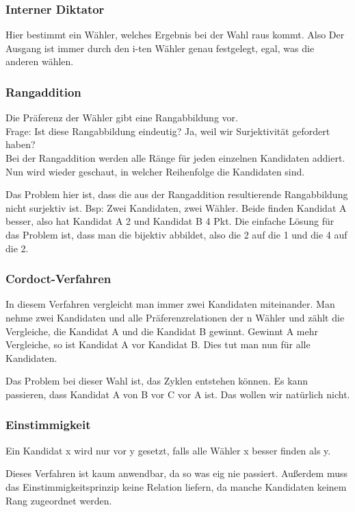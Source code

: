 \documentclass[]{article}
\begin{document}
\subsubsection*{Interner Diktator}
Hier bestimmt ein Wähler, welches Ergebnis bei der Wahl raus kommt. Also Der Ausgang ist immer durch den i-ten Wähler genau festgelegt, egal, was die anderen wählen.

\subsubsection*{Rangaddition}
Die Präferenz der Wähler gibt eine Rangabbildung vor. \\

Frage: Ist diese Rangabbildung eindeutig? Ja, weil wir Surjektivität gefordert haben? \\

Bei der Rangaddition werden alle Ränge für jeden einzelnen Kandidaten addiert. Nun wird wieder geschaut, in welcher Reihenfolge die Kandidaten sind. 

Das Problem hier ist, dass die aus der Rangaddition resultierende Rangabbildung nicht surjektiv ist. Bsp: Zwei Kandidaten, zwei Wähler. Beide finden Kandidat A besser, also hat Kandidat A 2 und Kandidat B 4 Pkt. Die einfache Lösung für das Problem ist, dass man die bijektiv abbildet, also die 2 auf die 1 und die 4 auf die 2. 

\subsubsection*{Cordoct-Verfahren}
 In diesem Verfahren vergleicht man immer zwei Kandidaten miteinander. Man nehme zwei Kandidaten und alle Präferenzrelationen der n Wähler und zählt die Vergleiche, die Kandidat A und die Kandidat B gewinnt. Gewinnt A mehr Vergleiche, so ist Kandidat A vor Kandidat B. Dies tut man nun für alle Kandidaten.
 
 Das Problem bei dieser Wahl ist, das Zyklen entstehen können. Es kann passieren, dass Kandidat A von B vor C vor A ist. Das wollen wir natürlich nicht.
 
\subsubsection*{Einstimmigkeit}
 Ein Kandidat x wird nur vor y gesetzt, falls alle Wähler x besser finden als y. 
 
 Dieses Verfahren ist kaum anwendbar, da so was eig nie passiert. Außerdem muss das Einstimmigkeitsprinzip keine Relation liefern, da manche Kandidaten keinem Rang zugeordnet werden. 
 
\end{document}
